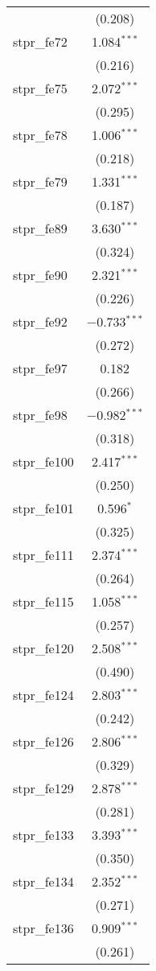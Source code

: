 \begin{table}[!htbp]
\begin{tabular}{@{\extracolsep{5pt}}lc}
  & (0.208) \\ 
  stpr\_fe72 & 1.084$^{***}$ \\ 
  & (0.216) \\ 
  stpr\_fe75 & 2.072$^{***}$ \\ 
  & (0.295) \\ 
  stpr\_fe78 & 1.006$^{***}$ \\ 
  & (0.218) \\ 
  stpr\_fe79 & 1.331$^{***}$ \\ 
  & (0.187) \\ 
  stpr\_fe89 & 3.630$^{***}$ \\ 
  & (0.324) \\ 
  stpr\_fe90 & 2.321$^{***}$ \\ 
  & (0.226) \\ 
  stpr\_fe92 & $-$0.733$^{***}$ \\ 
  & (0.272) \\ 
  stpr\_fe97 & 0.182 \\ 
  & (0.266) \\ 
  stpr\_fe98 & $-$0.982$^{***}$ \\ 
  & (0.318) \\ 
  stpr\_fe100 & 2.417$^{***}$ \\ 
  & (0.250) \\ 
  stpr\_fe101 & 0.596$^{*}$ \\ 
  & (0.325) \\ 
  stpr\_fe111 & 2.374$^{***}$ \\ 
  & (0.264) \\ 
  stpr\_fe115 & 1.058$^{***}$ \\ 
  & (0.257) \\ 
  stpr\_fe120 & 2.508$^{***}$ \\ 
  & (0.490) \\ 
  stpr\_fe124 & 2.803$^{***}$ \\ 
  & (0.242) \\ 
  stpr\_fe126 & 2.806$^{***}$ \\ 
  & (0.329) \\ 
  stpr\_fe129 & 2.878$^{***}$ \\ 
  & (0.281) \\ 
  stpr\_fe133 & 3.393$^{***}$ \\ 
  & (0.350) \\ 
  stpr\_fe134 & 2.352$^{***}$ \\ 
  & (0.271) \\ 
  stpr\_fe136 & 0.909$^{***}$ \\ 
  & (0.261) \\ 

\end{tabular}
\end{table}
